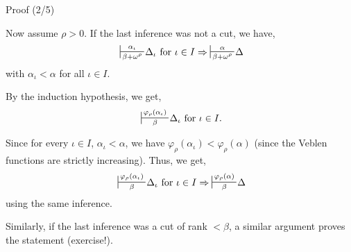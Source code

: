 \documentclass[10pt]{beamer}
\newcommand{\sintcons}[2]{\;\sststile{#2}{#1}\!}
\begin{document}
\begin{frame}{Proof (2/5)}

Now assume \(\rho > 0\). If the last inference was not a cut, we have,
$$
\sintcons{\alpha_\iota}{\beta+\omega^\rho} \Delta_\iota
\text{ for } \iota\in I \Rightarrow
\sintcons{\alpha}{\beta+\omega^\rho}\Delta
$$
with $\alpha_\iota < \alpha$ for all $\iota \in I$.





\pause



By the induction hypothesis, we get,
$$
\sintcons{\varphi_\rho(\alpha_\iota)}{\beta} \Delta_\iota
\text{ for } \iota\in I.
$$
\pause

Since for every $\iota \in I$, $\alpha_\iota < \alpha$, we have $\varphi_\rho(\alpha_\iota) < \varphi_\rho(\alpha)$ (since the Veblen functions are strictly increasing). Thus, we get,
$$
\sintcons{\varphi_\rho(\alpha_\iota)}{\beta} \Delta_\iota
\text{ for } \iota\in I \Rightarrow
\sintcons{\varphi_\rho(\alpha)}{\beta}\Delta
$$
using the same inference.
\pause

Similarly, if the last inference was a cut of rank $< \beta$, a similar argument proves the statement (exercise!).

\end{frame}
\end{document}
